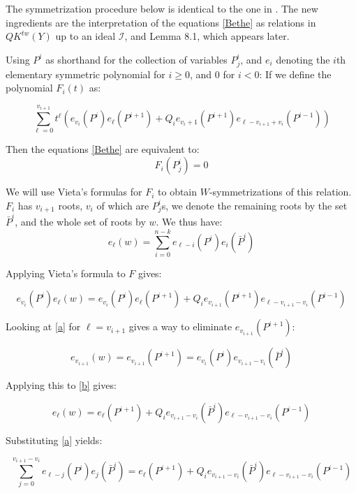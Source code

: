 \documentclass[11pt,letterpaper]{amsart}
\begin{document}
The symmetrization procedure below is identical to the one in \cite{conjpf}. The new ingredients are the interpretation of the equations \eqref{Bethe} as relations in $QK^{tw}(Y)$ up to an ideal $\mathscr{I}$, and Lemma 8.1, which appears later. 

Using $P^i$ as shorthand for the collection of variables $P^i_j$, and $e_i$ denoting the $i$th elementary symmetric polynomial for $i\geq 0$, and 0 for $i<0$: 
If we define the polynomial $F_i(t)$ as:

$$\sum_{\ell=0}^{v_{i+1}} t^\ell(e_{v_i}(P^i)e_\ell(P^{i+1})+Q_ie_{v_i+1}(P^{i+1})e_{\ell-v_{i+1}+v_i}(P^{i-1}))$$

Then the equations \eqref{Bethe} are equivalent to:
\begin{equation}
    F_i(P^i_j)=0
\end{equation}

We will use Vieta's formulas for $F_i$ to obtain $W$-symmetrizations of this relation. $F_i$ has $v_{i+1}$ roots, $v_i$ of which are $P^i_j$s, we denote the remaining roots by the set $\bar{P}^i$, and the whole set of roots by $w$. 
We thus have: 
\begin{equation}
\label{a}
e_\ell(w)=\sum_{i=0}^{n-k} e_{\ell-i}(P^i)e_{i}(\bar{P}^i) \end{equation}

Applying Vieta's formula to $F$ gives:

\begin{equation}
\label{b} e_{v_i}(P^i)e_\ell(w)=e_{v_i}(P^i)e_{\ell}(P^{i+1})+Q_ie_{v_{i+1}}(P^{i+1})e_{\ell-v_{i+1}-v_i}(P^{i-1})\end{equation}

Looking at \eqref{a} for $\ell=v_{i+1}$ gives a way to eliminate $e_{v_{i+1}}(P^{i+1})$:

$$e_{v_{i+1}}(w)=e_{v_{i+1}}(P^{i+1})=e_{v_i}(P^i)e_{v_{i+1}-v_i}(\bar{P}^i)$$


Applying this to \eqref{b} gives:


\begin{equation}
\label{c}e_\ell(w)=e_{\ell}(P^{i+1})+Q_ie_{v_{i+1}-v_i}(\bar{P}^{i})e_{\ell-v_{i+1}-v_i}(P^{i-1})\end{equation}

Substituting \eqref{a} yields:


\begin{equation}
\label{c'}\sum_{j=0}^{v_{i+1}-v_i}e_{\ell-j}(P^i)e_{j}(\bar{P}^i)=e_{\ell}(P^{i+1})+Q_ie_{v_{i+1}-v_i}(\bar{P}^{i})e_{\ell-v_{i+1}-v_i}(P^{i-1})\end{equation}
\end{document}
